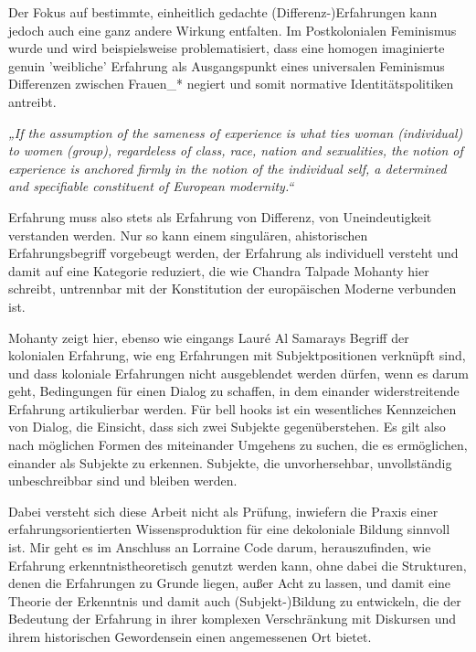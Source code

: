 Der Fokus auf bestimmte, einheitlich gedachte (Differenz-)Erfahrungen kann
jedoch auch eine ganz andere Wirkung entfalten. Im Postkolonialen Feminismus
wurde und wird beispielsweise problematisiert, dass eine homogen imaginierte
genuin 'weibliche' Erfahrung als Ausgangspunkt eines universalen Feminismus
Differenzen zwischen Frauen\_* negiert und somit normative Identitätspolitiken
antreibt.
\begin{myenv}
  \textit{
  „If the assumption of the sameness of experience is what ties woman
  (individual) to women (group), regardeless of class, race, nation and
  sexualities, the notion of experience is anchored firmly in the notion of the
  individual self, a determined and specifiable constituent of European
  modernity.“\footnotemark {}
  }
\end{myenv}

Erfahrung muss also stets als Erfahrung von Differenz, von Uneindeutigkeit
verstanden werden. Nur so kann einem singulären, ahistorischen
Erfahrungsbegriff vorgebeugt werden, der Erfahrung als individuell versteht und
damit auf eine Kategorie reduziert, die wie Chandra Talpade Mohanty hier
schreibt, untrennbar mit der Konstitution der europäischen Moderne verbunden
ist.\footnotemark{}

Mohanty zeigt hier, ebenso wie eingangs Lauré Al Samarays Begriff der
kolonialen Erfahrung, wie eng Erfahrungen mit Subjektpositionen verknüpft sind,
und dass koloniale Erfahrungen nicht ausgeblendet werden dürfen, wenn es darum
geht, Bedingungen für einen Dialog zu schaffen, in dem einander widerstreitende
Erfahrung artikulierbar werden. Für bell hooks ist ein wesentliches Kennzeichen
von Dialog, die Einsicht, dass sich zwei Subjekte
gegenüberstehen.\footnotemark{} Es gilt
also nach möglichen Formen des miteinander Umgehens zu suchen, die es
ermöglichen, einander als Subjekte zu erkennen. Subjekte, die unvorhersehbar,
unvollständig unbeschreibbar sind und bleiben werden.

Dabei versteht sich diese Arbeit nicht als Prüfung, inwiefern die Praxis einer
erfahrungsorientierten Wissensproduktion für eine dekoloniale Bildung sinnvoll
ist. Mir geht es im Anschluss an Lorraine Code darum, herauszufinden, wie
Erfahrung erkenntnistheoretisch genutzt werden kann, ohne dabei die Strukturen,
denen die Erfahrungen zu Grunde liegen, außer Acht zu lassen, und damit eine
Theorie der Erkenntnis und damit auch (Subjekt-)Bildung zu entwickeln, die der
Bedeutung der Erfahrung in ihrer komplexen Verschränkung mit Diskursen und
ihrem historischen Gewordensein einen angemessenen Ort
bietet.\footnotemark{}

